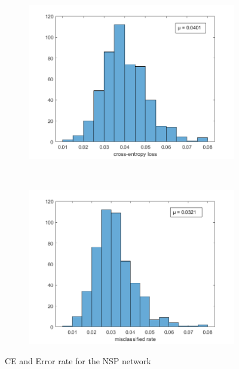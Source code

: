 \documentclass[11pt,a4paper]{article}
\begin{document}
\begin{figure}[htb]
  \centering
  \begin{subfigure}[b]{0.48\textwidth}
    \centering
    \includegraphics[width=\textwidth]{figures/NSP/ce_histogram_500.png}
  \end{subfigure}
  ~
  \begin{subfigure}[b]{0.48\textwidth}
    \centering
    \includegraphics[width=\textwidth]{figures/NSP/misclasified_histogram_500.png}
  \end{subfigure}
  \caption{CE and Error rate for the NSP network}
  \label{fig:NSP_HIST}
\end{figure}
\end{document}
